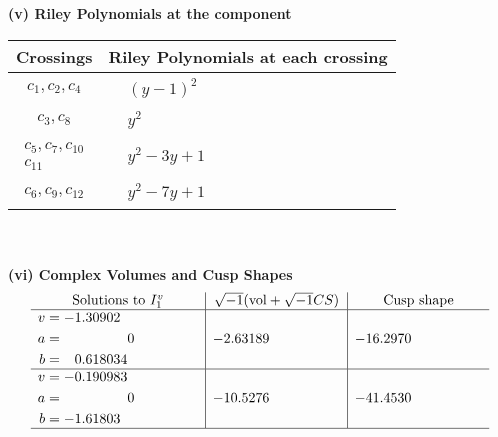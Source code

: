 \documentclass[1p]{elsarticle_modified}
\theoremstyle{definition}
\newcommand{\I}{\sqrt{-1}}
\begin{document}
\newpage\renewcommand{\arraystretch}{1}
\flushleft \textbf{(v) Riley Polynomials at the component}\newline \\
\begin{tabular}{m{50pt}|m{274pt}}
Crossings & \hspace{64pt}Riley Polynomials at each crossing \\
\hline $$\begin{aligned}c_{1},c_{2},c_{4}\end{aligned}$$&$\begin{aligned}
&(y-1)^2
\end{aligned}$\\
\hline $$\begin{aligned}c_{3},c_{8}\end{aligned}$$&$\begin{aligned}
&y^2
\end{aligned}$\\
\hline $$\begin{aligned}c_{5},c_{7},c_{10}\\c_{11}\end{aligned}$$&$\begin{aligned}
&y^2-3 y+1
\end{aligned}$\\
\hline $$\begin{aligned}c_{6},c_{9},c_{12}\end{aligned}$$&$\begin{aligned}
&y^2-7 y+1
\end{aligned}$\\
\hline
\end{tabular}\\~\\
\newpage\flushleft \textbf{(vi) Complex Volumes and Cusp Shapes}
$$\begin{array}{c|c|c}  
\text{Solutions to }I^v_{1}& \I (\text{vol} + \sqrt{-1}CS) & \text{Cusp shape}\\
 \hline 
\begin{aligned}
v &= -1.30902\phantom{ +0.000000I} \\
a &= \phantom{-0.000000 } 0 \\
b &= \phantom{-}0.618034\phantom{ +0.000000I}\end{aligned}
 & -2.63189\phantom{ +0.000000I} & -16.2970\phantom{ +0.000000I} \\ \hline\begin{aligned}
v &= -0.190983\phantom{ +0.000000I} \\
a &= \phantom{-0.000000 } 0 \\
b &= -1.61803\phantom{ +0.000000I}\end{aligned}
 & -10.5276\phantom{ +0.000000I} & -41.4530\phantom{ +0.000000I}\\
 \hline 
 \end{array}$$\newpage
\end{document}
